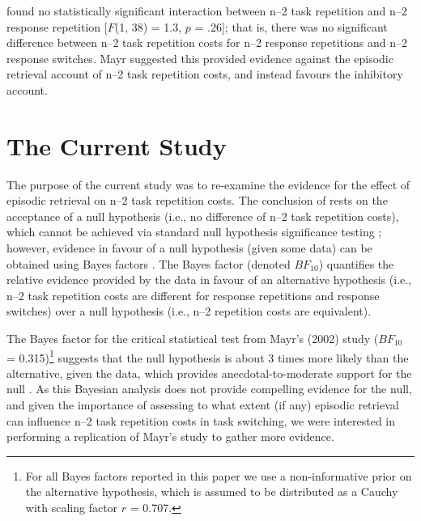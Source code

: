 \documentclass[a4paper, doc, natbib]{apa6}
\begin{document}
\cite{Mayr2002} found no statistically significant interaction between n--2 task repetition and n--2 response repetition [$F$(1, 38) = 1.3, $p$ = .26]; that is, there was no significant difference between n--2 task repetition costs for n--2 response repetitions and n--2 response switches. Mayr suggested this provided evidence against the episodic retrieval account of n--2 task repetition costs, and instead favours the inhibitory account.

\section{The Current Study}
The purpose of the current study was to re-examine the evidence for the effect of episodic retrieval on n--2 task repetition costs. The conclusion of \cite{Mayr2002} rests on the acceptance of a null hypothesis (i.e., no difference of n--2 task repetition costs), which cannot be achieved via standard null hypothesis significance testing \citep{Gallistel2009, Wagenmakers2007}; however, evidence in favour of a null hypothesis (given some data) can be obtained using Bayes factors \citep[e.g.,][]{Rouder2009}. The Bayes factor (denoted $BF_{10}$) quantifies the relative evidence provided by the data in favour of an alternative hypothesis (i.e., n--2 task repetition costs are different for response repetitions and response switches) over a null hypothesis (i.e., n--2 repetition costs are equivalent). 

The Bayes factor for the critical statistical test from Mayr's (2002) study ($BF_{10}$ = 0.315)\footnote{For all Bayes factors reported in this paper we use a non-informative prior on the alternative hypothesis, which is assumed to be distributed as a Cauchy with scaling factor $r$ = 0.707.} suggests that the null hypothesis is about 3 times more likely than the alternative, given the data, which provides anecdotal-to-moderate support for the null \citep[e.g.,][]{Schoenbrodtinpress}. As this Bayesian analysis does not provide compelling evidence for the null, and given the importance of assessing to what extent (if any) episodic retrieval can influence n--2 task repetition costs in task switching, we were interested in performing a replication of Mayr's study to gather more evidence.
\end{document}
